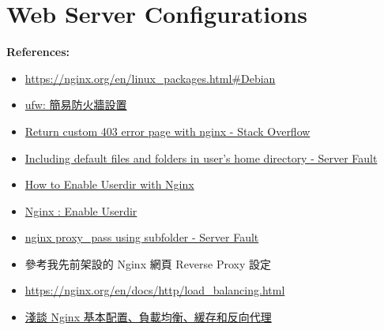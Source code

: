 \documentclass[12pt]{article}
\newenvironment{mycolorbox}[1][gray]{
  \renewmdenv[
    linewidth=2pt, linecolor=#1, backgroundcolor=#1!10,
    topline=false, bottomline=false, rightline=false,
    skipabove=10pt, skipbelow=10pt, innerleftmargin=10pt,
    innerrightmargin=0pt, innertopmargin=5pt, innerbottommargin=5pt
  ]{myquote}
  \begin{myquote}
}{\end{myquote}}
\begin{document}
\clearpage
\section{Web Server Configurations}
\begin{mycolorbox}[teal]
  \textbf{References:}
  \footnotesize
  \begin{itemize}
    \item \url{https://nginx.org/en/linux_packages.html#Debian}
    \item \href{https://noob.tw/ufw/}{ufw: 簡易防火牆設置}
    \item \href{https://stackoverflow.com/questions/3119108/return-custom-403-error-page-with-nginx}{Return custom 403 error page with nginx - Stack Overflow}
    \item \href{https://serverfault.com/questions/615886/including-default-files-and-folders-in-users-home-directory}{Including default files and folders in user's home directory - Server Fault}
    \item \href{https://www.siberoloji.com/enable-userdir-nginx-almalinux/}{How to Enable Userdir with Nginx}
    \item \href{https://www.server-world.info/en/note?os=Ubuntu_24.04&p=nginx&f=4}{Nginx : Enable Userdir}
    \item \href{https://serverfault.com/questions/792326/nginx-proxy-pass-using-subfolder}{nginx proxy\_pass using subfolder - Server Fault}
    \item 參考我先前架設的 Nginx 網頁 Reverse Proxy 設定
    \item \url{https://nginx.org/en/docs/http/load_balancing.html}
    \item \href{https://www.maxlist.xyz/2020/06/18/flask-nginx/}{淺談 Nginx 基本配置、負載均衡、緩存和反向代理}
  \end{itemize}
\end{mycolorbox}
\end{document}
